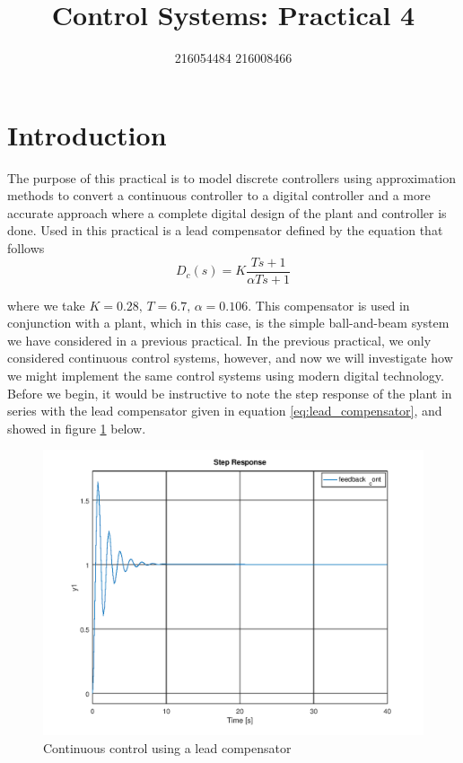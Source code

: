 \documentclass[a4paper, 12pt]{article}
\title{Control Systems: Practical 4}
\author{216054484 216008466}
\begin{document}
\maketitle
\newpage
{}
\tableofcontents
\listoffigures
\newpage
{}

\section{Introduction} %
\label{sec:introduction}
The purpose of this practical is to model discrete controllers using
approximation methods to convert a continuous controller to a digital
controller  and a more accurate approach where a complete digital design of the
plant and controller is done. Used in this practical is a lead compensator
defined by the equation that follows
\begin{equation}
	\label{eq:lead_compensator}
	D_c(s) = K \frac{Ts + 1}{\alpha Ts + 1}
\end{equation}

where we take $K = 0.28,\,T = 6.7,\,\alpha = 0.106$. This compensator is used
in conjunction with a plant, which in this case, is the simple ball-and-beam
system we have considered in a previous practical. In the previous practical,
we only considered continuous control systems, however, and now we will
investigate how we might implement the same control systems using modern
digital technology. Before we begin, it would be instructive to note the step
response of the plant in series with the lead compensator given in equation
\ref{eq:lead_compensator}, and showed in figure \ref{fig:continuous_control} below.

\begin{figure}[H]
  \centering
  \includegraphics[width=\textwidth]{img/continuous_control.png}
  \caption{Continuous control using a lead compensator}
  \label{fig:continuous_control}
\end{figure}
\end{document}
